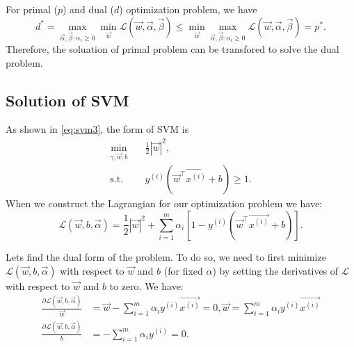 \documentclass[10pt,onecolumn]{book}
\begin{document}
For primal ($p$) and dual ($d$) optimization problem, we have 
\begin{equation}
d^* = \max_{\vec{\alpha}, \vec{\beta}: \alpha_i \geq 0} \min_{\vec{w}} \mathcal{L} (\vec{w}, \vec{\alpha}, \vec{\beta}) \leq \min_{\vec{w}} \max_{\vec{\alpha}, \vec{\beta}: \alpha_i \geq 0} \mathcal{L} (\vec{w}, \vec{\alpha}, \vec{\beta}) = p^*.
\end{equation}
Therefore, the soluation of primal problem can be transfored to solve the dual problem.

\subsection{Solution of SVM}
As shown in \ref{eq:svm3}, the form of SVM is
\begin{equation}\label{eq:svm3}
\begin{split}
\min_{\gamma, \vec{w}, b} & \quad  \frac{1}{2}|\vec{w}|^2, \\
\text{s.t. } &  \quad y^{(i)}(\vec{w}^\top \overrightarrow{x^{(i)}} + b) \geq 1.
\end{split}
\end{equation}
When we construct the Lagrangian for our optimization problem we have:
\begin{equation}\label{eq:svm_lagrangian}
\mathcal{L}(\vec{w}, b, \vec{\alpha}) = \frac{1}{2}|\vec{w}|^2 + \sum_{i = 1}^m \alpha_i [1 - y^{(i)}(\vec{w}^\top \overrightarrow{x^{(i)}} + b)].
\end{equation}

Lets find the dual form of the problem. To do so, we need to first minimize $\mathcal{L}(\vec{w}, b, \vec{\alpha})$ with respect to $\vec{w}$ and $b$ (for fixed $\alpha$) by setting the derivatives of $\mathcal{L}$ with respect to $\vec{w}$ and $b$ to zero. We have:
\begin{equation} \label{eq:svm_dual}
\begin{split}
\frac{\partial \mathcal{L}(\vec{w}, b, \vec{\alpha})}{\vec{w}} &= \vec{w} - \sum_{i=1}^m \alpha_i y^{(i)}\overrightarrow{x^{(i)}} = 0,  \vec{w} = \sum_{i=1}^m \alpha_i y^{(i)}\overrightarrow{x^{(i)}} \\
\frac{\partial \mathcal{L}(\vec{w}, b, \vec{\alpha})}{b} &= - \sum_{i=1}^m \alpha_i y^{(i)} = 0.
\end{split}
\end{equation}
\end{document}
